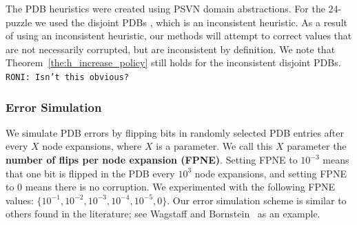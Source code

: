 \documentclass{article}
\newcommand{\roni}[1]{\mbox{\tt RONI: #1}}
\begin{document}

The PDB heuristics were created using PSVN domain abstractions. %
%
For the 24-puzzle we used the disjoint PDBs 
\cite{korf2002disjointPatternDatabase}, which is an inconsistent heuristic. As a result of using an inconsistent heuristic, our methods will attempt to correct values that are not necessarily corrupted, but are inconsistent by definition. We note that Theorem~\ref{the:h_increase_policy} still holds for the inconsistent disjoint PDBs. \roni{Isn't this obvious?}



\subsubsection{Error Simulation}


We simulate PDB errors by flipping bits in randomly selected PDB entries after every $X$ node expansions, where $X$ is a parameter. We call this $X$ parameter the \textbf{number of flips per node expansion (FPNE)}. Setting FPNE to $10^{-3}$ means that one bit is flipped in the PDB every $10^{3}$ node expansions, and setting FPNE to $0$ means there is no corruption. We experimented with the following FPNE values: 
$\{10^{-1},10^{-2}, 10^{-3}, 10^{-4}, 10^{-5}, 0\}$. 
Our error simulation scheme is similar to others found in the literature; see Wagstaff and Bornstein~ as an example. 


\end{document}
